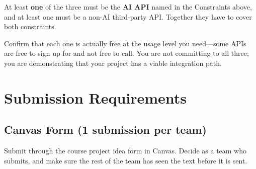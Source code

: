 \documentclass[11pt]{article}
\begin{document}
At least \textbf{one} of the three must be the \textbf{AI API} named in the Constraints above, and at least one must be a non-AI third-party API. Together they have to cover both constraints.

Confirm that each one is actually free at the usage level you need---some APIs are free to sign up for and not free to call. You are not committing to all three; you are demonstrating that your project has a viable integration path.

\section{Submission Requirements}

\subsection*{Canvas Form (1 submission per team)}
Submit through the course project idea form in Canvas. Decide as a team who submits, and make sure the rest of the team has seen the text before it is sent.
\end{document}
